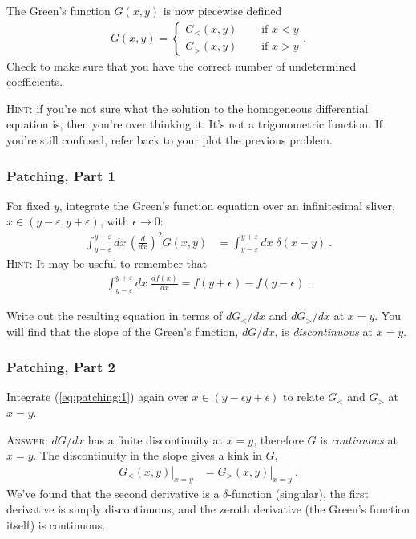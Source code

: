 \documentclass[12pt]{article}
\numberwithin{equation}{subsection}    %
\begin{document}
The Green's function $G(x,y)$ is now piecewise defined
\begin{align}G(x,y) = \left\{ 
\begin{array}{ll}
 	G_<(x,y) & \quad\text{ if } x<y\\
 	G_>(x,y) & \quad\text{ if } x>y
 \end{array}\right. .
 \label{eq:piecewise:def}
 \end{align}
Check to make sure that you have the correct number of undetermined coefficients. 

\textsc{Hint}: if you're not sure what the solution to the homogeneous differential equation is, then you're over thinking it. It's not a trigonometric function. If you're still confused, refer back to your plot the previous problem.

\subsubsection{Patching, Part 1}
For fixed $y$, integrate the Green's function equation over an infinitesimal sliver, $x \in (y-\varepsilon, y + \varepsilon)$, with $\epsilon \to 0$: 
\begin{align}
	\int_{y-\varepsilon}^{y+\varepsilon} dx\, \left(\frac{d}{dx}\right)^2 G(x,y) &=  
	\int_{y-\varepsilon}^{y+\varepsilon} dx\; \delta(x-y)
	\ .
	\label{eq:patching:1}
\end{align}
\textsc{Hint}: It may be useful to remember that
\begin{align}
	\int_{y-\varepsilon}^{y+\varepsilon} dx\; \frac{df(x)}{dx} = f(y+\epsilon) - f(y-\epsilon) \ .
\end{align}

Write out the resulting equation in terms of $dG_</dx$ and $dG_>/dx$ at $x=y$. You will find that the slope of the Green's function, $dG/dx$, is \emph{discontinuous} at $x=y$. 


\subsubsection{Patching, Part 2}

Integrate (\ref{eq:patching:1}) again over $x\in(y-\epsilon y+\epsilon)$ to relate $G_<$ and $G_>$ at $x=y$.


\textsc{Answer}: $dG/dx$ has a finite discontinuity at $x=y$, therefore $G$ is \emph{continuous} at $x=y$. The discontinuity in the slope gives a kink in $G$,
\begin{align}
	\left.G_<(x, y)\right|_{x=y} &= \left.G_>(x, y)\right|_{x=y} \ .
\end{align}
We've found that the second derivative is a $\delta$-function (singular), the first derivative is simply discontinuous, and the zeroth derivative (the Green's function itself) is continuous.
\end{document}
